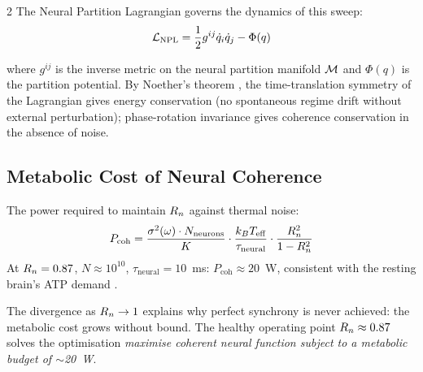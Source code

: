 \begin{multicols}{2}
The Neural Partition Lagrangian governs the dynamics of this sweep:
\begin{equation}
\mathcal{L}_{\mathrm{NPL}} = \frac{1}{2}g^{ij}\dot{q}_i\dot{q}_j - \Phi(q)
\label{eq:ch09-LNPL}
\end{equation}

where $g^{ij}$ is the inverse metric on the neural partition manifold
$\mathcal{M}$ and $\Phi(q)$ is the partition potential. By Noether's theorem
\citep{noether1918invariante}, the time-translation symmetry of the
Lagrangian gives energy conservation (no spontaneous regime drift
without external perturbation); phase-rotation invariance gives
coherence conservation in the absence of noise.

\subsection{Metabolic Cost of Neural Coherence}

\begin{theorem}
\label{thm:ch09-Pcoh}
The power required to maintain $R_n$ against thermal noise:
\begin{equation}
P_{\mathrm{coh}} = \frac{\sigma^2(\omega) \cdot N_{\mathrm{neurons}}}
{K}\cdot\frac{k_B T_{\mathrm{eff}}}{\tau_{\mathrm{neural}}}
\cdot\frac{R_n^2}{1-R_n^2}
\label{eq:ch09-Pcoh}
\end{equation}
At $R_n = 0.87$, $N \approx 10^{10}$, $\tau_{\mathrm{neural}} = 10$~ms:
$P_{\mathrm{coh}} \approx 20$~W, consistent with the resting brain's
ATP demand \citep{attwell2001energy,raichle2002appraising}.
\end{theorem}

The divergence as $R_n \to 1$ explains why perfect synchrony is never
achieved: the metabolic cost grows without bound. The healthy operating
point $R_n \approx 0.87$ solves the optimisation \textit{maximise
coherent neural function subject to a metabolic budget of $\sim$20~W}.

\end{multicols}


